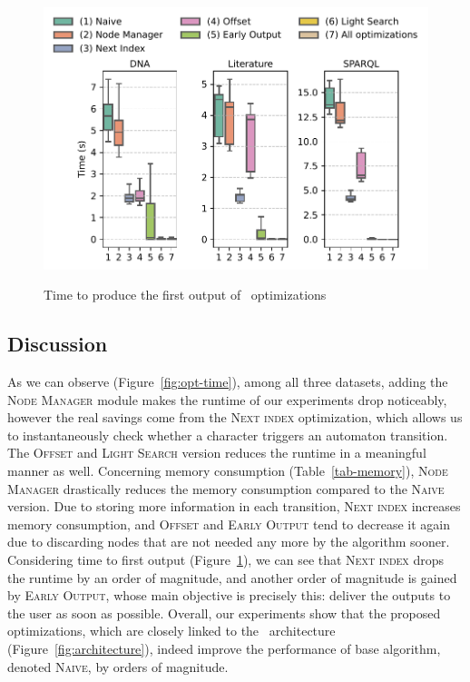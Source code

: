 \begin{figure}[t]
	\centering
	\includegraphics[width=.8\textwidth]{figures/versions-fot.pdf}
	\label{fig:opt-firstOT}
	\caption{Time to produce the first output of \rematch\ optimizations}
	\label{fig-optimizations}
\end{figure}



\subsection{Discussion}
As we can observe (Figure~\ref{fig:opt-time}), among all three datasets, adding
the \textsc{Node Manager} module makes the runtime of our experiments drop
noticeably, however the real savings come from the \textsc{Next index}
optimization, which allows us to instantaneously check whether a character
triggers an automaton transition. The \textsc{Offset} and \textsc{Light Search}
version reduces the runtime in a meaningful manner as well. Concerning memory
consumption (Table~\ref{tab-memory}), \textsc{Node Manager} drastically reduces
the memory consumption compared to the \textsc{Naive} version. Due to storing
more information in each transition, \textsc{Next index} increases memory
consumption, and \textsc{Offset} and \textsc{Early Output} tend to decrease it
again due to discarding nodes that are not needed any more by the algorithm
sooner. Considering time to first output (Figure~\ref{fig-optimizations}), we
can see that \textsc{Next index} drops the runtime by an order of magnitude, and
another order of magnitude is gained by \textsc{Early Output}, whose main
objective is precisely this: deliver the outputs to the user as soon as
possible. Overall, our experiments show that the proposed optimizations, which
are closely linked to the \rematch\ architecture
(Figure~\ref{fig:architecture}), indeed improve the performance of base
algorithm, denoted \textsc{Naive}, by orders of magnitude.


